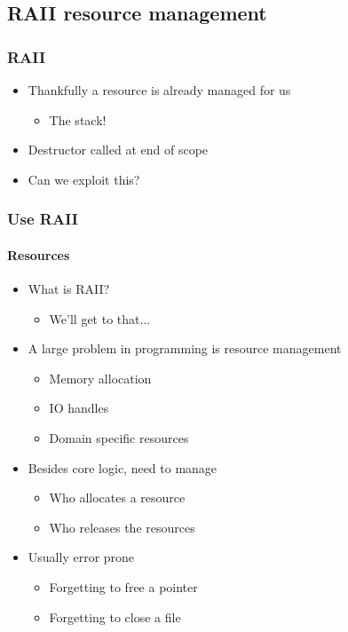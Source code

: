 


\subsection{RAII resource management}
\frame{\subsectionpage}

\begin{frame}
    \frametitle{RAII}
    \begin{itemize}
        \item<1->Thankfully a resource is already managed for us
            \begin{itemize}
                \item<2->The stack!
            \end{itemize}
        \item<2->Destructor called at end of scope
        \item<2->Can we exploit this?
    \end{itemize}
\end{frame}

\begin{frame}
    \frametitle{\declarerule Use RAII}
    \framesubtitle{Resources}
    \begin{itemize}
        \item What is RAII?
            \begin{itemize}
                \item We'll get to that...
            \end{itemize}
        \item A large problem in programming is resource management
            \begin{itemize}
                \item Memory allocation
                \item IO handles
                \item Domain specific resources
            \end{itemize}
        \item Besides core logic, need to manage
            \begin{itemize}
                \item Who allocates a resource
                \item Who releases the resources
            \end{itemize}
        \item Usually error prone
            \begin{itemize}
                \item Forgetting to free a pointer
                \item Forgetting to close a file
            \end{itemize}
    \end{itemize}
\end{frame}

